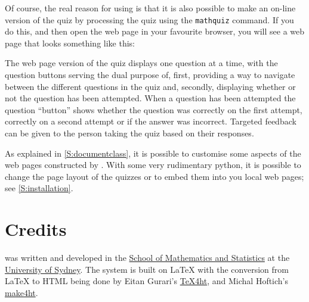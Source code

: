 \documentclass[svgnames]{article}
\begin{document}
    Of course, the real reason for using \MathQuiz is that it is also
    possible to make an on-line version of the quiz by processing the
    quiz using the \texttt{mathquiz} command. If you do this, and then open
    the web page in your favourite browser, you will see a web page
    that looks something like this:

    \begin{center}
    \end{center}

    The web page version of the quiz displays one question at a time,
    with the question buttons serving the dual purpose of, first,
    providing a way to navigate between the different questions in the
    quiz and, secondly, displaying whether or not the question has been
    attempted. When a question has been attempted the question
    ``button'' shows whether the question was correctly on the first
    attempt, correctly on a second attempt or if the answer was
    incorrect. Targeted feedback can be given to the person taking the
    quiz based on their responses.

    As explained in \autoref{S:documentclass}, it is possible to
    customise some aspects of the web pages constructed by \MathQuiz.
    With some very rudimentary python, it is possible to change the page
    layout of the quizzes or to embed them into you local web pages; see
    \autoref{S:installation}.

\section{Credits}
    \MathQuiz{} was written and developed in the
    \href{http://www.maths.usyd.edu.au/}{School of Mathematics and
    Statistics} at the \href{http://www.usyd.edu.au/}{University of
    Sydney}.  The system is built on \LaTeX{} with the conversion from
    \LaTeX{} to HTML being done by Eitan Gurari's
    \href{http://www.cis.ohio-state.edu/~gurari/TeX4ht/mn.html}{TeX4ht},
    and Michal Hoftich's
    \href{https://github.com/michal-h21/make4ht}{make4ht}.
\end{document}
